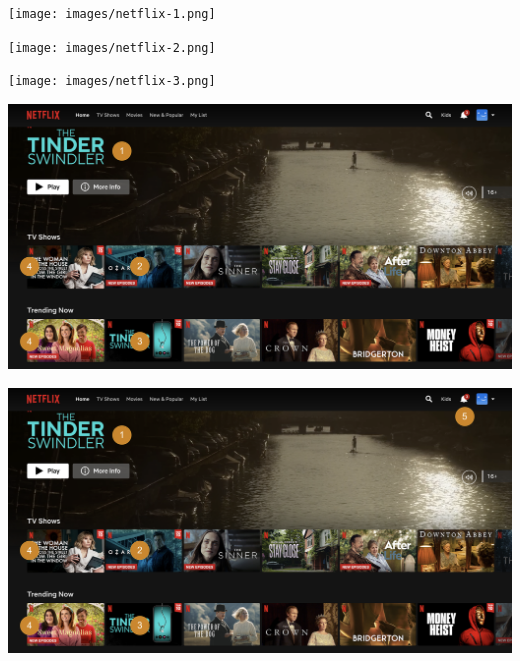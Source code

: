 \documentclass[11pt,aspectratio=169,handout=true]{beamer}
\begin{document}
\begin{frame}{}

\begin{center}
\texttt{[image: images/netflix-1.png]}
\end{center}

\end{frame}

\begin{frame}{}

\begin{center}
\texttt{[image: images/netflix-2.png]}
\end{center}

\end{frame}

\begin{frame}{}

\begin{center}
\texttt{[image: images/netflix-3.png]}
\end{center}

\end{frame}

\begin{frame}{}

\begin{center}
\includegraphics[scale=0.25]{images/netflix-4.png}
\end{center}

\end{frame}

\begin{frame}{}

\begin{center}
\includegraphics[scale=0.25]{images/netflix-5.png}
\end{center}

\end{frame}
\end{document}

